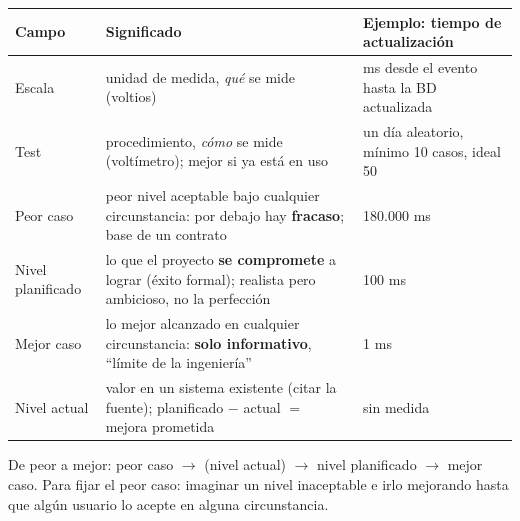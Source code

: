 \documentclass[11pt,a4paper]{article}
\begin{document}
\begin{center}\small
\begin{tabularx}{\textwidth}{@{}l X l@{}}
\toprule
\textbf{Campo} & \textbf{Significado} & \textbf{Ejemplo: tiempo de actualización}\\
\midrule
Escala & unidad de medida, \emph{qué} se mide (voltios) & ms desde el evento hasta la BD actualizada\\
Test & procedimiento, \emph{cómo} se mide (voltímetro); mejor si ya está en uso & un día aleatorio, mínimo 10 casos, ideal 50\\
Peor caso & peor nivel aceptable bajo cualquier circunstancia: por debajo hay \textbf{fracaso}; base de un contrato & 180.000 ms\\
Nivel planificado & lo que el proyecto \textbf{se compromete} a lograr (éxito formal); realista pero ambicioso, no la perfección & 100 ms\\
Mejor caso & lo mejor alcanzado en cualquier circunstancia: \textbf{solo informativo}, ``límite de la ingeniería'' & 1 ms\\
Nivel actual & valor en un sistema existente (citar la fuente); planificado $-$ actual $=$ mejora prometida & sin medida\\
\bottomrule
\end{tabularx}
\end{center}
De peor a mejor: peor caso $\to$ (nivel actual) $\to$ nivel planificado $\to$ mejor caso. Para fijar el peor
caso: imaginar un nivel inaceptable e irlo mejorando hasta que algún usuario lo acepte en alguna circunstancia.
\end{document}
